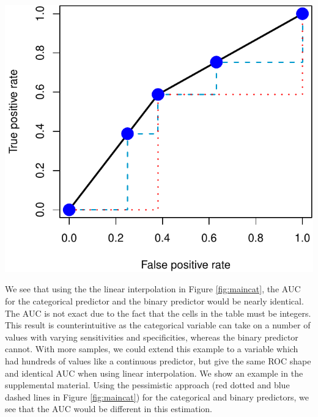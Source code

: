 \documentclass[smallextended]{svjour3}       %
\let\origfigure\figure
\let\endorigfigure\endfigure
\renewenvironment{figure}[1][2] {
    \expandafter\origfigure\expandafter[H]
} {
    \endorigfigure
}
\begin{document}
\begin{figure}[H]
\includegraphics[width=1\linewidth]{index_revision_files/figure-latex/maincat-1} \caption{ROC curve of a 4-level categorical variable compared to the binary predictor. Here we present the ROC curve of a categorical predictor (blue points) compared to that of the binary predictor (black line).  We see that the ROC curve is identical if the linear inerpolation is used (accounting for ties).  The red (dotted) and blue (dashed) lines show the ROC of the binary and categorical predictor, respectively, using the pessimistic approach.  We believe this demonstrates that although there is more gradation in the categorical variable, using the standard approach provides the same AUC, though we believe these variables have different levels of information as the binary predictor cannot obtain values other than the 2 categories.  }\label{fig:maincat}
\end{figure}

We see that using the the linear interpolation in Figure
\ref{fig:maincat}, the AUC for the categorical predictor and the binary
predictor would be nearly identical. The AUC is not exact due to the
fact that the cells in the table must be integers. This result is
counterintuitive as the categorical variable can take on a number of
values with varying sensitivities and specificities, whereas the binary
predictor cannot. With more samples, we could extend this example to a
variable which had hundreds of values like a continuous predictor, but
give the same ROC shape and identical AUC when using linear
interpolation. We show an example in the supplemental material. Using
the pessimistic approach (red dotted and blue dashed lines in Figure
\ref{fig:maincat}) for the categorical and binary predictors, we see
that the AUC would be different in this estimation.
\end{document}

